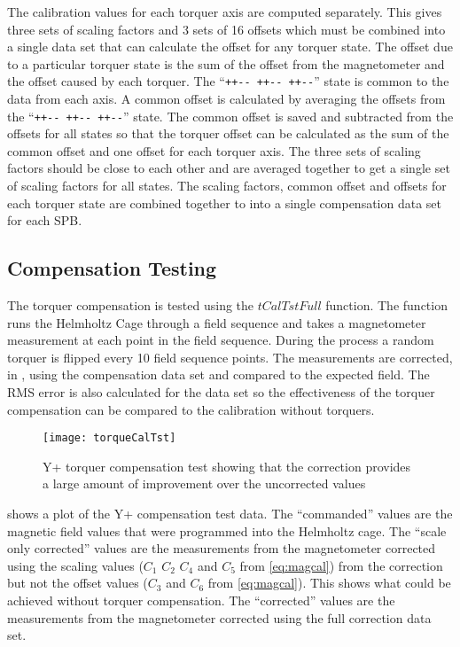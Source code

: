 The calibration values for each torquer axis are computed separately. This gives three sets of scaling factors and 3 sets of 16 offsets which must be combined into a single data set that can calculate the offset for any torquer state. The offset due to a particular torquer state is the sum of the offset from the magnetometer and the offset caused by each torquer. The \enquote{\texttt{++-{}- ++-{}- ++-{}-}} state is common to the data from each axis. A common offset is calculated by averaging the offsets from the \enquote{\texttt{++-{}- ++-{}- ++-{}-}} state. The common offset is saved and subtracted from the offsets for all states so that the torquer offset can be calculated as the sum of the common offset and one offset for each torquer axis. The three sets of scaling factors should be close to each other and are averaged together to get a single set of scaling factors for all states. The scaling factors, common offset and offsets for each torquer state are combined together to into a single compensation data set for each \ac{SPB}.

\subsection{Compensation Testing}
\label{sec:tq-comp-tst}

The torquer compensation is tested using the \lstMat$tCalTstFull$ function. The function runs the Helmholtz Cage through a field sequence and takes a magnetometer measurement at each point in the field sequence. During the process a random torquer is flipped every 10 field sequence points. The measurements are corrected, in \matlab, using the compensation data set and compared to the expected field. The RMS error is also calculated for the data set so the effectiveness of the torquer compensation can be compared to the calibration without torquers.

\begin{figure}[!ht]
    \centering
    \texttt{[image: torqueCalTst]}
    \caption{Y+ torquer compensation test showing that the correction provides a large amount of improvement over the uncorrected values}
    \label{fig:tqtst}
\end{figure}

 shows a plot of the Y+ compensation test data. The \enquote{commanded} values are the magnetic field values that were programmed into the Helmholtz cage. The \enquote{scale only corrected} values are the measurements from the magnetometer corrected using the scaling values ($C_1$ $C_2$ $C_4$ and $C_5$ from \cref{eq:magcal}) from the correction but not the offset values ($C_3$ and $C_6$ from \cref{eq:magcal}). This shows what could be achieved without torquer compensation. The \enquote{corrected} values are the measurements from the magnetometer corrected using the full correction data set.

